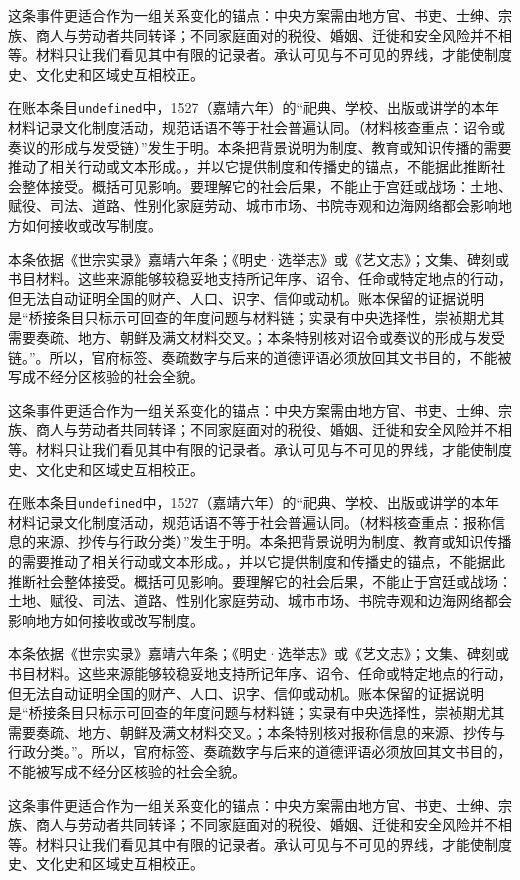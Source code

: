 这条事件更适合作为一组关系变化的锚点：中央方案需由地方官、书吏、士绅、宗族、商人与劳动者共同转译；不同家庭面对的税役、婚姻、迁徙和安全风险并不相等。材料只让我们看见其中有限的记录者。承认可见与不可见的界线，才能使制度史、文化史和区域史互相校正。

在账本条目\texttt{undefined}中，1527（嘉靖六年）的“祀典、学校、出版或讲学的本年材料记录文化制度活动，规范话语不等于社会普遍认同。（材料核查重点：诏令或奏议的形成与发受链）”发生于明。本条把背景说明为制度、教育或知识传播的需要推动了相关行动或文本形成。，并以它提供制度和传播史的锚点，不能据此推断社会整体接受。概括可见影响。要理解它的社会后果，不能止于宫廷或战场：土地、赋役、司法、道路、性别化家庭劳动、城市市场、书院寺观和边海网络都会影响地方如何接收或改写制度。

本条依据《世宗实录》嘉靖六年条；《明史·选举志》或《艺文志》；文集、碑刻或书目材料。这些来源能够较稳妥地支持所记年序、诏令、任命或特定地点的行动，但无法自动证明全国的财产、人口、识字、信仰或动机。账本保留的证据说明是“桥接条目只标示可回查的年度问题与材料链；实录有中央选择性，崇祯期尤其需要奏疏、地方、朝鲜及满文材料交叉。；本条特别核对诏令或奏议的形成与发受链。”。所以，官府标签、奏疏数字与后来的道德评语必须放回其文书目的，不能被写成不经分区核验的社会全貌。

这条事件更适合作为一组关系变化的锚点：中央方案需由地方官、书吏、士绅、宗族、商人与劳动者共同转译；不同家庭面对的税役、婚姻、迁徙和安全风险并不相等。材料只让我们看见其中有限的记录者。承认可见与不可见的界线，才能使制度史、文化史和区域史互相校正。

在账本条目\texttt{undefined}中，1527（嘉靖六年）的“祀典、学校、出版或讲学的本年材料记录文化制度活动，规范话语不等于社会普遍认同。（材料核查重点：报称信息的来源、抄传与行政分类）”发生于明。本条把背景说明为制度、教育或知识传播的需要推动了相关行动或文本形成。，并以它提供制度和传播史的锚点，不能据此推断社会整体接受。概括可见影响。要理解它的社会后果，不能止于宫廷或战场：土地、赋役、司法、道路、性别化家庭劳动、城市市场、书院寺观和边海网络都会影响地方如何接收或改写制度。

本条依据《世宗实录》嘉靖六年条；《明史·选举志》或《艺文志》；文集、碑刻或书目材料。这些来源能够较稳妥地支持所记年序、诏令、任命或特定地点的行动，但无法自动证明全国的财产、人口、识字、信仰或动机。账本保留的证据说明是“桥接条目只标示可回查的年度问题与材料链；实录有中央选择性，崇祯期尤其需要奏疏、地方、朝鲜及满文材料交叉。；本条特别核对报称信息的来源、抄传与行政分类。”。所以，官府标签、奏疏数字与后来的道德评语必须放回其文书目的，不能被写成不经分区核验的社会全貌。

这条事件更适合作为一组关系变化的锚点：中央方案需由地方官、书吏、士绅、宗族、商人与劳动者共同转译；不同家庭面对的税役、婚姻、迁徙和安全风险并不相等。材料只让我们看见其中有限的记录者。承认可见与不可见的界线，才能使制度史、文化史和区域史互相校正。

